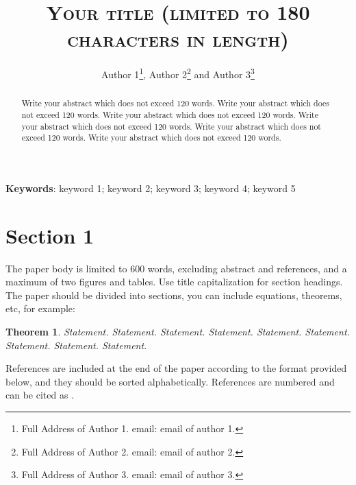 \documentclass[12pt]{article}
\newtheorem{theorem}{Theorem}
\begin{document}

\title{\textsc{Your title (limited to 180 characters in length)}} %



\author{Author 1\footnote{Full Address of Author 1. email: email of author 1.}, Author 2\footnote{Full Address of Author 2. email: email of author 2.}
and Author 3\footnote{Full Address of Author 3. email: email of author 3. }\\  %
}

\date{\empty}
\maketitle



\begin{abstract}
Write your abstract which does not exceed 120 words. Write your abstract which does not exceed 120 words. Write your abstract which does not exceed 120 words. Write your abstract which does not exceed 120 words. Write your abstract which does not exceed 120 words. Write your abstract which does not exceed 120 words. 
\end{abstract}

\noindent\textbf{Keywords}: {keyword 1; keyword 2; keyword 3; keyword 4; keyword 5} %


\section{Section 1} \label{sec}

The paper body is limited to 600 words, excluding abstract and references, and a maximum of two figures and tables. Use title capitalization for section headings. The paper should be divided into sections, you can include equations, theorems, etc, for example:
\begin{theorem}
Statement. Statement. Statement. Statement. Statement. Statement. Statement. Statement. Statement.
\end{theorem}
References are included at the end of the paper according to the format provided below, and they should be sorted alphabetically. References  are numbered and can be cited as \cite{reference1}.
\end{document}
